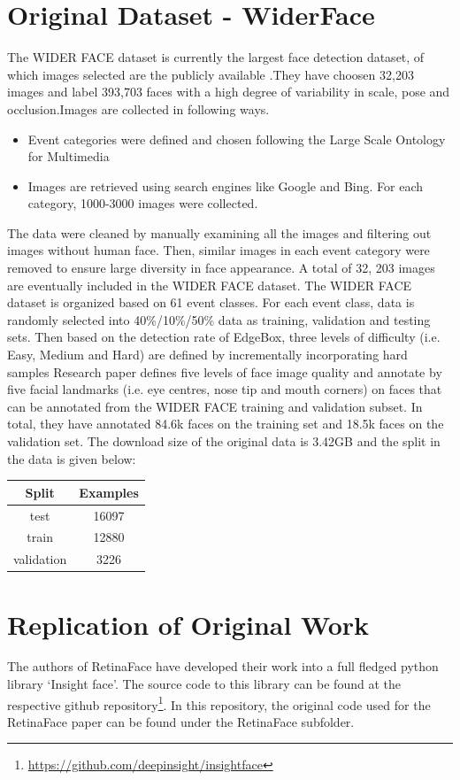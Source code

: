 \documentclass{article}
\begin{document}
\section{Original Dataset - WiderFace}

The WIDER FACE dataset is currently the largest face detection dataset, of which images selected are the publicly available .They have  choosen 32,203 images and label 393,703 faces with a high degree of variability in scale, pose and occlusion.Images are collected in  following ways. 
\begin{itemize}
\item Event categories were defined and chosen following the Large Scale Ontology for Multimedia
\item Images are retrieved using search engines like Google and Bing. For each category, 1000-3000 images were collected.
\end{itemize}

The data were cleaned by manually examining all the images and filtering out images without human face. Then, similar images in each event category were removed to ensure large diversity in face appearance. A total of 32, 203 images are eventually included in the WIDER FACE dataset.
The WIDER FACE dataset is organized based on 61 event classes. For each event class, data is  randomly selected into 40\%/10\%/50\% data as training, validation and testing sets. Then based on the detection rate of EdgeBox, three levels of difficulty (i.e. Easy, Medium and Hard) are defined by incrementally incorporating hard samples
Research paper defines  five levels of face image quality and annotate by  five facial landmarks (i.e. eye centres, nose tip and mouth corners) on faces that can be annotated from the WIDER FACE training and validation subset. In total, they have annotated 84.6k faces on the training set and 18.5k faces on the validation set. The download size of the original data is 3.42GB and the split in the data is given below:
\begin{center}
\begin{tabular}{|c|c|}
	\hline
Split & Examples \\
\hline
test & 16097 \\
train & 12880\\
validation & 3226\\
\hline
\end{tabular}
\end{center}
\section{Replication of Original Work}
The authors of RetinaFace have developed their work into a full fledged python library ‘Insight face’. The source code to this library can be found at the respective github repository\footnote{\url{https://github.com/deepinsight/insightface}}. In this repository, the original code used for the RetinaFace paper can be found under the RetinaFace subfolder. 
\end{document}

